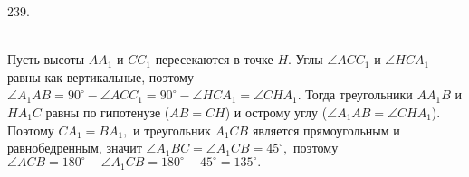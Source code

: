 239. \begin{figure}[ht!]
\end{figure}\\
Пусть высоты $AA_1$ и $CC_1$ пересекаются в точке $H.$ Углы $\angle ACC_1$ и $\angle HCA_1$ равны как вертикальные, поэтому $\angle A_1AB=90^\circ-\angle ACC_1=90^\circ-\angle HCA_1=\angle CHA_1.$ Тогда треугольники $AA_1B$ и $HA_1C$ равны по гипотенузе ($AB=CH$) и острому углу ($\angle A_1AB=\angle CHA_1$). Поэтому $CA_1=BA_1,$ и треугольник $A_1CB$ является прямоугольным и равнобедренным, значит $\angle A_1BC=\angle A_1CB=45^\circ,$ поэтому $\angle ACB=180^\circ-\angle A_1CB=180^\circ-45^\circ=135^\circ.$\\
